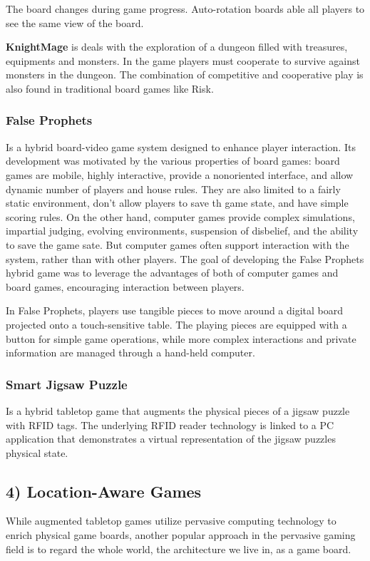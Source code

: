       The board changes during game progress. Auto-rotation boards able all players to see the same view of the board. 

      {\bf KnightMage} is deals with the exploration of a dungeon filled with treasures, equipments and monsters. In the game players must cooperate to survive against monsters in the dungeon. The combination of competitive and cooperative play is also found in traditional board games like Risk.

      \subsubsection*{False Prophets}
      Is a hybrid board-video game system designed to enhance player interaction. Its development was motivated by the various properties of board games: board games are mobile, highly interactive, provide a nonoriented interface, and allow dynamic number of players and house rules. They are also limited to a fairly static environment, don't allow players to save th game state, and have simple scoring rules. On the other hand, computer games provide complex simulations, impartial judging, evolving environments, suspension of disbelief, and the ability to save the game sate. But computer games often support interaction with the system, rather than with other players. 
      The goal of developing the False Prophets hybrid game was to leverage the advantages of both of computer games and board games, encouraging interaction between players. 

      In False Prophets, players use tangible pieces to move around a digital board projected onto a touch-sensitive table. The playing pieces are equipped with a button for simple game operations, while more complex interactions and private information are managed through a hand-held computer. 

      \subsubsection*{Smart Jigsaw Puzzle}
      Is a hybrid tabletop game that augments the physical pieces of a jigsaw puzzle with RFID tags. The underlying RFID reader technology is linked to a PC application that demonstrates a virtual representation of the jigsaw puzzles physical state. 


    \subsection*{4) Location-Aware Games}
    While augmented tabletop games utilize pervasive computing technology to enrich physical game boards, another popular approach in the pervasive gaming field is to regard the whole world, the architecture we live in, as a game board. 

